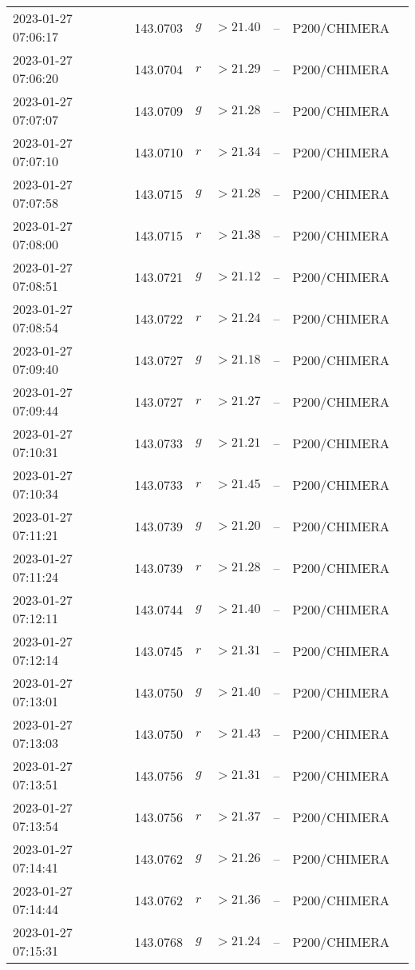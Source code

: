 \documentclass{nature_plusfigure}
\begin{document}
\begin{supplement}
\begin{center}
\begin{longtable}{lllllll}
2023-01-27 07:06:17 & 143.0703 & $g$ & $>21.40$ & -- & P200/CHIMERA &  \\ 
2023-01-27 07:06:20 & 143.0704 & $r$ & $>21.29$ & -- & P200/CHIMERA &  \\ 
2023-01-27 07:07:07 & 143.0709 & $g$ & $>21.28$ & -- & P200/CHIMERA &  \\ 
2023-01-27 07:07:10 & 143.0710 & $r$ & $>21.34$ & -- & P200/CHIMERA &  \\ 
2023-01-27 07:07:58 & 143.0715 & $g$ & $>21.28$ & -- & P200/CHIMERA &  \\ 
2023-01-27 07:08:00 & 143.0715 & $r$ & $>21.38$ & -- & P200/CHIMERA &  \\ 
2023-01-27 07:08:51 & 143.0721 & $g$ & $>21.12$ & -- & P200/CHIMERA &  \\ 
2023-01-27 07:08:54 & 143.0722 & $r$ & $>21.24$ & -- & P200/CHIMERA &  \\ 
2023-01-27 07:09:40 & 143.0727 & $g$ & $>21.18$ & -- & P200/CHIMERA &  \\ 
2023-01-27 07:09:44 & 143.0727 & $r$ & $>21.27$ & -- & P200/CHIMERA &  \\ 
2023-01-27 07:10:31 & 143.0733 & $g$ & $>21.21$ & -- & P200/CHIMERA &  \\ 
2023-01-27 07:10:34 & 143.0733 & $r$ & $>21.45$ & -- & P200/CHIMERA &  \\ 
2023-01-27 07:11:21 & 143.0739 & $g$ & $>21.20$ & -- & P200/CHIMERA &  \\ 
2023-01-27 07:11:24 & 143.0739 & $r$ & $>21.28$ & -- & P200/CHIMERA &  \\ 
2023-01-27 07:12:11 & 143.0744 & $g$ & $>21.40$ & -- & P200/CHIMERA &  \\ 
2023-01-27 07:12:14 & 143.0745 & $r$ & $>21.31$ & -- & P200/CHIMERA &  \\ 
2023-01-27 07:13:01 & 143.0750 & $g$ & $>21.40$ & -- & P200/CHIMERA &  \\ 
2023-01-27 07:13:03 & 143.0750 & $r$ & $>21.43$ & -- & P200/CHIMERA &  \\ 
2023-01-27 07:13:51 & 143.0756 & $g$ & $>21.31$ & -- & P200/CHIMERA &  \\ 
2023-01-27 07:13:54 & 143.0756 & $r$ & $>21.37$ & -- & P200/CHIMERA &  \\ 
2023-01-27 07:14:41 & 143.0762 & $g$ & $>21.26$ & -- & P200/CHIMERA &  \\ 
2023-01-27 07:14:44 & 143.0762 & $r$ & $>21.36$ & -- & P200/CHIMERA &  \\ 
2023-01-27 07:15:31 & 143.0768 & $g$ & $>21.24$ & -- & P200/CHIMERA &  \\ 

\end{longtable}
\end{center}
\end{supplement}
\end{document}
